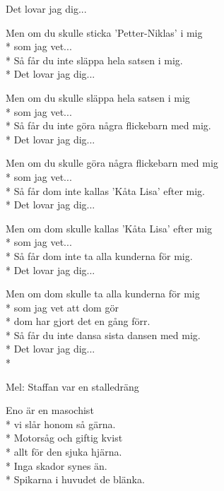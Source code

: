 \begin{SongText}
\begin{SongVerse}
        Det lovar jag dig...
    \end{SongVerse}
    \begin{SongVerse}
        Men om du skulle sticka 'Petter-Niklas' i mig\\*%
        som jag vet...\\*%
        Så får du inte släppa hela satsen i mig.\\*%
        Det lovar jag dig...
    \end{SongVerse}
    \begin{SongVerse}
        Men om du skulle släppa hela satsen i mig\\*%
        som jag vet...\\*%
        Så får du inte göra några flickebarn med mig.\\*%
        Det lovar jag dig...
    \end{SongVerse}
    \begin{SongVerse}
        Men om du skulle göra några flickebarn med mig\\*%
        som jag vet...\\*%
        Så får dom inte kallas 'Kåta Lisa' efter mig.\\*%
        Det lovar jag dig...
    \end{SongVerse}
    \begin{SongVerse}
        Men om dom skulle kallas 'Kåta Lisa' efter mig\\*%
        som jag vet...\\*%
        Så får dom inte ta alla kunderna för mig.\\*%
        Det lovar jag dig...
    \end{SongVerse}
    \begin{SongVerse}
        Men om dom skulle ta alla kunderna för mig\\*%
        som jag vet att dom gör\\*%
        dom har gjort det en gång förr.\\*%
        Så får du inte dansa sista dansen med mig.\\*%
        Det lovar jag dig...\\*%
    \end{SongVerse}
\end{SongText}
\begin{SongText}[ENO]
    \begin{SongInfo}
        Mel: Staffan var en stalledräng
    \end{SongInfo}
    \begin{SongVerse}
        Eno är en masochist\\*%
        vi slår honom så gärna.\\*%
        Motorsåg och giftig kvist\\*%
        allt för den sjuka hjärna.\\*%
        Inga skador synes än.\\*%
        Spikarna i huvudet de blänka.
    \end{SongVerse}
\end{SongText}
